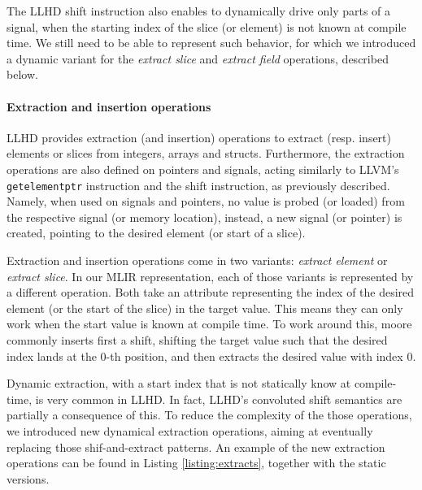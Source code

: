 The LLHD shift instruction also enables to dynamically drive only parts of a signal, when the starting index of the slice (or element) is not known at compile time. We still need to be able to represent such behavior, for which we introduced a dynamic variant for the \textit{extract slice} and \textit{extract field} operations, described below.

\paragraph{Extraction and insertion operations}
LLHD provides extraction (and insertion) operations to extract (resp. insert) elements or slices from integers, arrays and structs. Furthermore, the extraction operations are also defined on pointers and signals, acting similarly to LLVM's \texttt{getelementptr} instruction and the shift instruction, as previously described. Namely, when used on signals and pointers, no value is probed (or loaded) from the respective signal (or memory location), instead, a new signal (or pointer) is created, pointing to the desired element (or start of a slice).

Extraction and insertion operations come in two variants: \textit{extract element} or \textit{extract slice}. In our MLIR representation, each of those variants is represented by a different operation. Both take an attribute representing the index of the desired element (or the start of the slice) in the target value. This means they can only work when the start value is known at compile time. To work around this, moore commonly inserts first a shift, shifting the target value such that the desired index lands at the $0$-th position, and then extracts the desired value with index $0$.

Dynamic extraction, \ie with a start index that is not statically know at compile-time, is very common in LLHD. In fact, LLHD's convoluted shift semantics are partially a consequence of this. To reduce the complexity of the those operations, we introduced new dynamical extraction operations, aiming at eventually replacing those shif-and-extract patterns. An example of the new extraction operations can be found in Listing \ref{listing:extracts}, together with the static versions.


